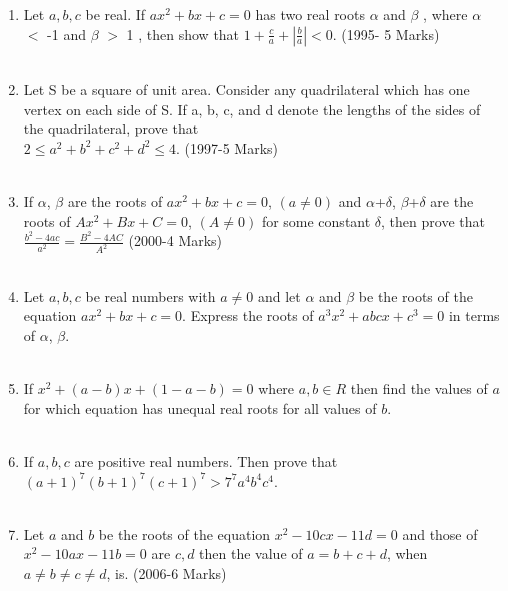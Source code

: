 \documentclass[journal,12pt,twocolumn]{IEEEtran}
\theoremstyle{remark}
\begin{document}
\begin{enumerate}[start=13]
 \item Let $a,b,c$ be real. If $ax^2+bx+c=0$ has two real roots $\alpha$ and $\beta$ , where $\alpha$ $<$ -1 and $\beta$ $>$ 1 , then show that $1+\frac{c}{a}+|\frac{b}{a}|<0$.
 \hfill{(1995- 5 Marks)}\\\\
 \item Let S be a square of unit area. Consider any quadrilateral which has one vertex on each side of S. If a, b, c, and d denote the lengths of the sides of the quadrilateral, prove that \\$2 \leq a^2+b^2+c^2+d^2 \leq 4$. \hfill{(1997-5 Marks)}\\\\
 
 \item If $\alpha$, $\beta$ are the roots of $ax^2+bx+c=0$, $(a\neq 0)$ and $\alpha$+$\delta$, $\beta$+$\delta$ are the roots of $Ax^2+Bx+C=0$, $(A\neq 0)$ for some constant $\delta$, then prove that $\frac{b^2-4ac}{a^2}=\frac{B^2-4AC}{A^2}$ \hfill{(2000-4 Marks)} \\\\

 \item Let $a, b,c $ be real numbers with $a\neq0$ and let $\alpha$ and $\beta$ be the roots of the equation $ax^2+bx+c=0$. Express the roots of $a^3x^2+abcx+c^3=0$ in terms of $\alpha$, $\beta$. \hspace*{\fill}\\\\
\item If $x^2+(a-b)x+(1-a-b)=0$ where $a, b\in R$ then find the values of $a$ for which equation has unequal real roots for all values of $b$. \hspace*{\fill}\\\\
\item If $a, b, c$ are positive real numbers. Then prove that $(a+1)^7(b+1)^7(c+1)^7 > 7^7a^4b^4c^4$. \hspace*{\fill}\\\\
\item Let $a$ and $b$ be the roots of the equation $x^2-10cx-11d=0$ and those of $x^2-10ax-11b=0$ are $c,d $ then the value of $a=b+c+d$, when $a\neq b\neq c\neq d$, is. \hfill{(2006-6 Marks)}

 
 


\end{enumerate}
\bigskip

\renewcommand{\thefigure}{\theenumi}
\renewcommand{\thetable}{\theenumi}
\end{document}
